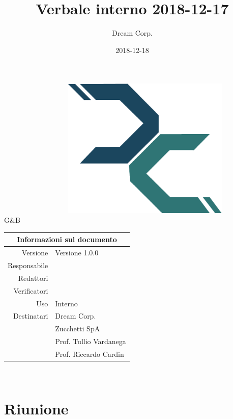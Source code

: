 \documentclass[12pt]{article}
\title{\fontsize{40}{40}\selectfont Verbale interno 2018-12-17}
\author{Dream Corp.}
\date{2018-12-18}
\newcommand{\red}{\mat}
\newcommand{\verp}{\daL}
\newcommand{\res}{\daG}
\newcommand{\version}{Versione 1.0.0}
\newcommand{\use}{Interno}
\begin{document}
\maketitle
	\begin{center}
	~~~~~~~~~~~~~~~~~~\includegraphics[width = 80mm]{../../logo.png}
	\newline
	\huge 
	\\G\&B
	
	\begin{table}[!htpb]
		\centering
		\begin{tabular}{r|l}
			\multicolumn{2}{c}{Informazioni sul documento}\\
			\hline
			Versione & \version \\
			Responsabile & \res\\
			Redattori & \red \\
			Verificatori & \verp\\
			Uso & \use\\
			Destinatari & Dream Corp. \\
			& Zucchetti SpA\\
			& Prof. Tullio Vardanega\\
			& Prof. Riccardo Cardin\\
		\end{tabular}
	\end{table}
	
	\end{center}
	\newpage

\newline
~\newline


\section{Riunione}
\end{document}
